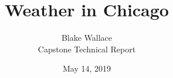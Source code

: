 \documentclass[10pt]{article}
\renewcommand{\qedsymbol}{$\blacksquare$} %
\begin{document}
 
 
 
\title{Weather in Chicago}%
\author{Blake Wallace\\ %
Capstone Technical Report} %
\date{May 14, 2019}
 
\maketitle

\vspace{2mm}
\end{document}
